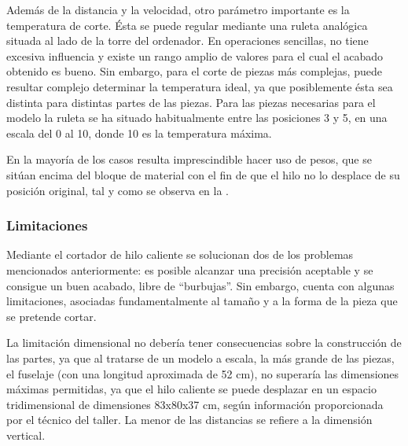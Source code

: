 Además de la distancia y la velocidad, otro parámetro importante es la temperatura de corte. Ésta se puede regular mediante una ruleta analógica situada al lado de la torre del ordenador. En operaciones sencillas, no tiene excesiva influencia y existe un rango amplio de valores para el cual el acabado obtenido es bueno. Sin embargo, para el corte de piezas más complejas, puede resultar complejo determinar la temperatura ideal, ya que posiblemente ésta sea distinta para distintas partes de las piezas. Para las piezas necesarias para el modelo la ruleta se ha situado habitualmente entre las posiciones 3 y 5, en una escala del 0 al 10, donde 10 es la temperatura máxima.

En la mayoría de los casos resulta imprescindible hacer uso de pesos, que se sitúan encima del bloque de material con el fin de que el hilo no lo desplace de su posición original, tal y como se observa en la .


\subsubsection{Limitaciones}
\label{sec:building:technique:limitations}

Mediante el cortador de hilo caliente se solucionan dos de los problemas mencionados anteriormente: es posible alcanzar una precisión aceptable y se consigue un buen acabado, libre de “burbujas”. Sin embargo, cuenta con algunas limitaciones, asociadas fundamentalmente al tamaño y a la forma de la pieza que se pretende cortar.

La limitación dimensional no debería tener consecuencias sobre la construcción de las partes, ya que al tratarse de un modelo a escala, la más grande de las piezas, el fuselaje (con una longitud aproximada de 52 cm), no superaría las dimensiones máximas permitidas, ya que el hilo caliente se puede desplazar en un espacio tridimensional de dimensiones 83x80x37 cm, según información proporcionada por el técnico del taller. La menor de las distancias se refiere a la dimensión vertical.

